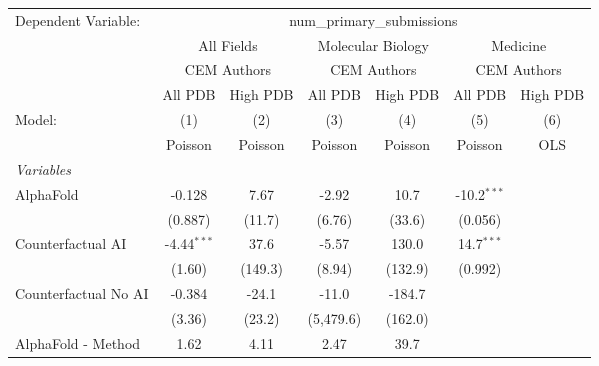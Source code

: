 \begingroup
\centering
\begin{tabular}{lcccccc}
   \tabularnewline \midrule \midrule
   Dependent Variable: & \multicolumn{6}{c}{num\_primary\_submissions}\\
 & \multicolumn{2}{c}{All Fields} & \multicolumn{2}{c}{Molecular Biology} & \multicolumn{2}{c}{Medicine} \\
\cmidrule(lr){2-3} \cmidrule(lr){4-5} \cmidrule(lr){6-7}
 & \multicolumn{2}{c}{CEM Authors} & \multicolumn{2}{c}{CEM Authors} & \multicolumn{2}{c}{CEM Authors} \\
\cmidrule(lr){2-3} \cmidrule(lr){4-5} \cmidrule(lr){6-7}
 & \multicolumn{1}{c}{All PDB} & \multicolumn{1}{c}{High PDB} & \multicolumn{1}{c}{All PDB} & \multicolumn{1}{c}{High PDB} & \multicolumn{1}{c}{All PDB} & \multicolumn{1}{c}{High PDB} \\
\cmidrule(lr){2-2} \cmidrule(lr){3-3} \cmidrule(lr){4-4} \cmidrule(lr){5-5} \cmidrule(lr){6-6} \cmidrule(lr){7-7}
   Model:                                                     & (1)           & (2)     & (3)       & (4)     & (5)           & (6)\\  
                                                              &  Poisson      & Poisson & Poisson   & Poisson & Poisson       & OLS\\  
   \midrule
   \emph{Variables}\\
   AlphaFold                                                  & -0.128        & 7.67    & -2.92     & 10.7    & -10.2$^{***}$ &   \\   
                                                              & (0.887)       & (11.7)  & (6.76)    & (33.6)  & (0.056)       &   \\   
   Counterfactual AI                                          & -4.44$^{***}$ & 37.6    & -5.57     & 130.0   & 14.7$^{***}$  &   \\   
                                                              & (1.60)        & (149.3) & (8.94)    & (132.9) & (0.992)       &   \\   
   Counterfactual No AI                                       & -0.384        & -24.1   & -11.0     & -184.7  &               &   \\   
                                                              & (3.36)        & (23.2)  & (5,479.6) & (162.0) &               &   \\   
   AlphaFold - Method                                         & 1.62          & 4.11    & 2.47      & 39.7    &               &   \\   

\end{tabular}

